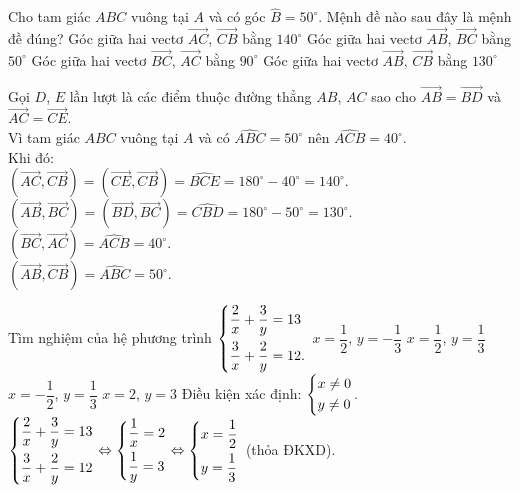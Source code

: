 \begin{ex}%
 Cho tam giác $ABC$ vuông tại $A$ và có góc $\widehat{B} = 50^\circ$. Mệnh đề nào sau đây là mệnh đề đúng?
 \choice
  {\True Góc giữa hai vectơ $\vec{AC}$, $\vec{CB}$ bằng $140^\circ$}
  {Góc giữa hai vectơ $\vec{AB}$, $\vec{BC}$ bằng $50^\circ$}
  {Góc giữa hai vectơ $\vec{BC}$, $\vec{AC}$ bằng $90^\circ$}
  {Góc giữa hai vectơ $\vec{AB}$, $\vec{CB}$ bằng $130^\circ$}
 \loigiai
 {
 \immini
 {
 Gọi $D$, $E$ lần lượt là các điểm thuộc đường thẳng $AB$, $AC$ sao cho $\vec{AB} = \vec{BD}$ và $\vec{AC} = \vec{CE}$.\\
 Vì tam giác $ABC$ vuông tại $A$ và có $\widehat{ABC} = 50^\circ$ nên $\widehat{ACB} = 40^\circ$.\\
 Khi đó:\\
 $\left(\vec{AC},\vec{CB}\right) = \left(\vec{CE},\vec{CB}\right) = \widehat{BCE} = 180^\circ - 40^\circ = 140^\circ$.\\
 $\left(\vec{AB},\vec{BC}\right) = \left(\vec{BD},\vec{BC}\right) = \widehat{CBD} = 180^\circ - 50^\circ = 130^\circ$.\\
 $\left(\vec{BC},\vec{AC}\right) = \widehat{ACB} = 40^\circ$.\\
 $\left(\vec{AB},\vec{CB}\right) = \widehat{ABC} = 50^\circ$.
 }
 {
 }
 }
\end{ex}


\begin{ex}%
 Tìm nghiệm của hệ phương trình $\left\{\begin{aligned}& \dfrac{2}{x} + \dfrac{3}{y} = 13 \\& \dfrac{3}{x} + \dfrac{2}{y} = 12.\end{aligned}\right.$
 \choice
  {$x = \dfrac{1}{2}$, $y = -\dfrac{1}{3}$}
  {\True $x = \dfrac{1}{2}$, $y = \dfrac{1}{3}$}
  {$x = -\dfrac{1}{2}$, $y = \dfrac{1}{3}$}
  {$x = 2$, $y = 3$}
 \loigiai
 {
 Điều kiện xác định: $\left\{\begin{aligned}& x \neq 0 \\& y \neq 0\end{aligned}\right.$.\\
 $\left\{\begin{aligned}& \dfrac{2}{x} + \dfrac{3}{y} = 13 \\& \dfrac{3}{x} + \dfrac{2}{y} = 12\end{aligned}\right. \Leftrightarrow \left\{\begin{aligned}& \dfrac{1}{x} = 2 \\& \dfrac{1}{y} = 3\end{aligned}\right. \Leftrightarrow \left\{\begin{aligned}& x = \dfrac{1}{2} \\& y = \dfrac{1}{3}\end{aligned}\right.$ (thỏa ĐKXD).
 }
\end{ex}



